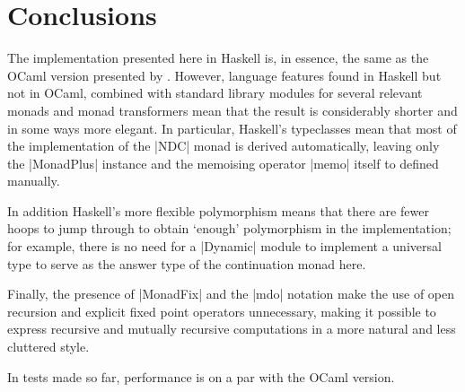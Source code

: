 \documentclass[a4paper,10pt]{article}
\begin{document}
\section{Conclusions}
The implementation presented here in Haskell is, in essence, the same as the OCaml
version presented by \cite{Abdallah2017a}. However, language features found in 
Haskell but not in OCaml, combined with standard library modules for several relevant 
monads and monad transformers mean that the result is considerably shorter and
in some ways more elegant. In particular, Haskell's typeclasses mean that most of
the implementation of the |NDC| monad is derived automatically, leaving only the
|MonadPlus| instance and the memoising operator |memo| itself to defined manually.

In addition Haskell's more flexible polymorphism means that there are fewer hoops
to jump through to obtain `enough' polymorphism in the implementation; for example, 
there is no
need for a |Dynamic| module to implement a universal type to serve as the answer type 
of the continuation monad here.

Finally, the presence of |MonadFix| and the |mdo| notation make the use of open
recursion and explicit fixed point operators unnecessary, making it possible to
express recursive and mutually recursive computations in a more natural and
less cluttered style.

In tests made so far, performance is on a par with the OCaml version.


\end{document}
